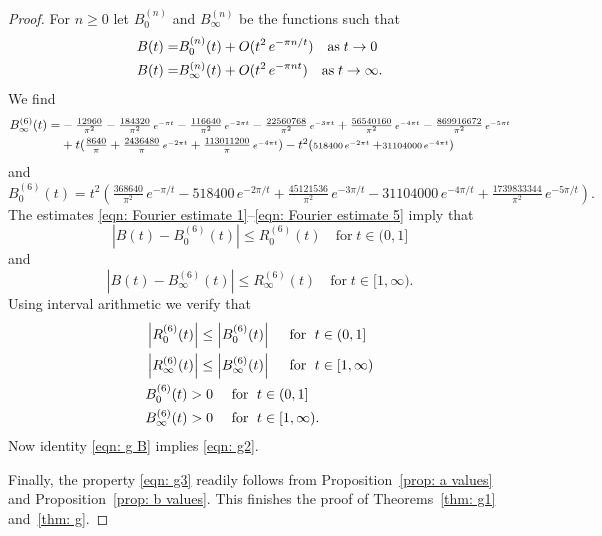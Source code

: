 \begin{proof}
\noindent For $n\geq 0$ let $B_0^{(n)}$ and  $B_{\infty}^{(n)}$ be the functions  such that
\begin{align}
  B(t)=&B_0^{(n)}(t)+O(t^2\,e^{-\pi n /t})\quad\mbox{as}\;t\to0\notag\\
  B(t)=&B_\infty^{(n)}(t)+O(t^2\,e^{-\pi n t})\quad\mbox{as}\;t\to\infty.\notag
\end{align}
We find
\begin{align}B_\infty^{(6)}(t)=&-\tfrac{12960}{\pi ^2}-\tfrac{184320}{\pi ^2}\,\scriptstyle e^{-\pi  t}\displaystyle-\tfrac{116640}{\pi ^2} \,\scriptstyle e^{-2\pi  t}\displaystyle-\tfrac{22560768}{\pi ^2}\,\scriptstyle e^{-3\pi  t}\displaystyle+\tfrac{56540160}{\pi ^2}\,\scriptstyle e^{-4\pi  t}\displaystyle-\tfrac{869916672 }{\pi ^2} \,\scriptstyle e^{-5\pi  t}\displaystyle\notag\\
&+t(\tfrac{8640 }{\pi }+\tfrac{2436480}{\pi }\,\scriptstyle e^{-2\pi  t}\displaystyle+\tfrac{113011200 }{\pi }\,\scriptstyle e^{-4\pi  t}\textstyle)-t^2(\scriptstyle518400\,\scriptstyle e^{-2\pi  t}\displaystyle+\scriptstyle31104000\,\scriptstyle e^{-4\pi  t}\displaystyle)\notag
\end{align}
and
$$B_0^{(6)}(t)= t^2(\tfrac{368640}{\pi ^2}\, e^{-\pi/t}-518400\, e^{-2 \pi /t}+\tfrac{45121536 }{\pi ^2}\,e^{-3 \pi/t}-31104000\, e^{-4 \pi/t}+\tfrac{1739833344 }{\pi ^2}\,e^{-5 \pi/t}) .$$
The estimates \eqref{eqn: Fourier estimate 1}--\eqref{eqn: Fourier estimate 5} imply that $$\left|B(t)-B_0^{(6)}(t)\right|\leq R_0^{(6)}(t)\quad\mbox{for}\;t\in(0,1]$$
and
$$\left|B(t)-B_\infty^{(6)}(t)\right|\leq R_\infty^{(6)}(t)\quad\mbox{for}\;t\in[1,\infty).$$
Using interval arithmetic we verify that
\begin{align}
&\left|R_0^{(6)}(t)\right|\leq\left|B_0^{(6)}(t)\right|\quad\mbox{ for }\;t\in(0,1]\notag \\
&\left|R_\infty^{(6)}(t)\right|\leq\left|B_\infty^{(6)}(t)\right|\quad\mbox{ for }\;t\in[1,\infty)\notag \\
&B_0^{(6)}(t)>0\quad\mbox{ for }\;t\in(0,1]\notag \\
&B_\infty^{(6)}(t)>0\quad\mbox{ for }\;t\in[1,\infty). \notag
\end{align}
Now identity \eqref{eqn: g B} implies \eqref{eqn: g2}.

Finally, the property \eqref{eqn: g3} readily follows from Proposition~\ref{prop: a values} and Proposition~\ref{prop: b values}.
This finishes the proof of Theorems~\ref{thm: g1} and~\ref{thm: g}.
  \end{proof}




